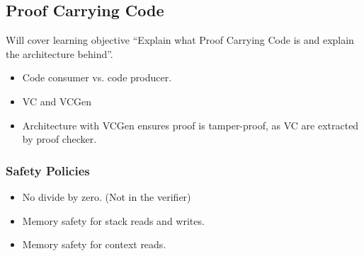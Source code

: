 \subsection{Proof Carrying Code}
\label{subsec:proof_carrying_code}

Will cover learning objective ``Explain what Proof Carrying Code is and explain the architecture behind''.

\begin{itemize}
\item 
Code consumer vs. code producer.
\item VC and VCGen
  \item Architecture with VCGen ensures proof is tamper-proof, as VC are extracted by proof checker.
\end{itemize}




\subsubsection{Safety Policies}
\label{subsec:safety_policies}

\begin{itemize}
\item No divide by zero. (Not in the verifier)
\item Memory safety for stack reads and writes.
\item Memory safety for context reads.

\end{itemize}

